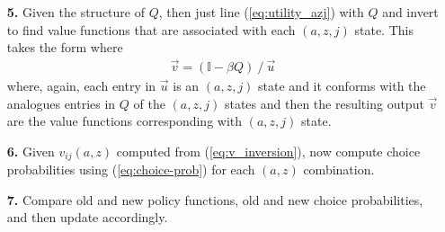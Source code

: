 \documentclass[12pt,pdftex]{article}
\begin{document}
\begin{onehalfspacing}
\begin{itemize}
\item[\textbf{5.}] Given the structure of $Q$, then just line (\ref{eq:utility_azj}) with $Q$ and invert to find value functions that are associated with each $(a,z,j)$ state. This takes the form where 
\begin{align}
\vec{v} = (\mathbb{I} - \beta Q) \ / \  \vec{u} \label{eq:v_inversion}
\end{align}
where, again, each entry in $\vec{u}$ is an $(a,z,j)$ state and it conforms with the analogues entries in $Q$ of the $(a,z,j)$ states and then the resulting output $\vec{v}$ are the value functions corresponding with $(a,z,j)$ state.

\item[\textbf{6.}] Given $v_{ij}(a,z)$ computed from (\ref{eq:v_inversion}), now compute choice probabilities using (\ref{eq:choice-prob}) for each $(a,z)$ combination.

\item[\textbf{7.}] Compare old and new policy functions, old and new choice probabilities, and then update accordingly.

\end{itemize}




\end{onehalfspacing}
\end{document}
